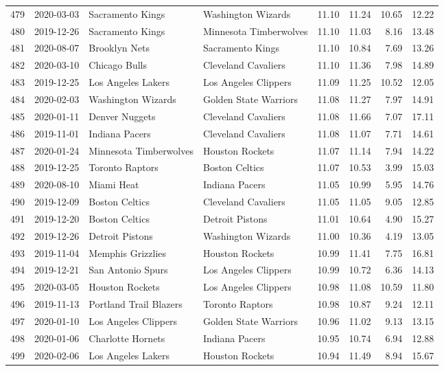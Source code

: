\documentclass[
  11pt,
]{article}
\theoremstyle{nonumberplain}
\begin{document}
\begin{longtable}{rl|llr|rrr}
479 & 2020-03-03 & Sacramento Kings & Washington Wizards & 11.10 & 11.24 & 10.65 & 12.22\\
480 & 2019-12-26 & Sacramento Kings & Minnesota Timberwolves & 11.10 & 11.03 & 8.16 & 13.48\\
481 & 2020-08-07 & Brooklyn Nets & Sacramento Kings & 11.10 & 10.84 & 7.69 & 13.26\\
482 & 2020-03-10 & Chicago Bulls & Cleveland Cavaliers & 11.10 & 11.36 & 7.98 & 14.89\\
483 & 2019-12-25 & Los Angeles Lakers & Los Angeles Clippers & 11.09 & 11.25 & 10.52 & 12.05\\
484 & 2020-02-03 & Washington Wizards & Golden State Warriors & 11.08 & 11.27 & 7.97 & 14.91\\
485 & 2020-01-11 & Denver Nuggets & Cleveland Cavaliers & 11.08 & 11.66 & 7.07 & 17.11\\
486 & 2019-11-01 & Indiana Pacers & Cleveland Cavaliers & 11.08 & 11.07 & 7.71 & 14.61\\
487 & 2020-01-24 & Minnesota Timberwolves & Houston Rockets & 11.07 & 11.14 & 7.94 & 14.22\\
488 & 2019-12-25 & Toronto Raptors & Boston Celtics & 11.07 & 10.53 & 3.99 & 15.03\\
489 & 2020-08-10 & Miami Heat & Indiana Pacers & 11.05 & 10.99 & 5.95 & 14.76\\
490 & 2019-12-09 & Boston Celtics & Cleveland Cavaliers & 11.05 & 11.05 & 9.05 & 12.85\\
491 & 2019-12-20 & Boston Celtics & Detroit Pistons & 11.01 & 10.64 & 4.90 & 15.27\\
492 & 2019-12-26 & Detroit Pistons & Washington Wizards & 11.00 & 10.36 & 4.19 & 13.05\\
493 & 2019-11-04 & Memphis Grizzlies & Houston Rockets & 10.99 & 11.41 & 7.75 & 16.81\\
494 & 2019-12-21 & San Antonio Spurs & Los Angeles Clippers & 10.99 & 10.72 & 6.36 & 14.13\\
495 & 2020-03-05 & Houston Rockets & Los Angeles Clippers & 10.98 & 11.08 & 10.59 & 11.80\\
496 & 2019-11-13 & Portland Trail Blazers & Toronto Raptors & 10.98 & 10.87 & 9.24 & 12.11\\
497 & 2020-01-10 & Los Angeles Clippers & Golden State Warriors & 10.96 & 11.02 & 9.13 & 13.15\\
498 & 2020-01-06 & Charlotte Hornets & Indiana Pacers & 10.95 & 10.74 & 6.94 & 12.88\\
499 & 2020-02-06 & Los Angeles Lakers & Houston Rockets & 10.94 & 11.49 & 8.94 & 15.67\\

\end{longtable}
\end{document}
